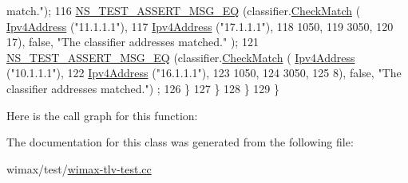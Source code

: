 \begin{DoxyCode}
{       match."});
116               \hyperlink{group__testing_ga2a9d78cffb3db8e867c35fff0b698cf5}{NS\_TEST\_ASSERT\_MSG\_EQ} (classifier.\hyperlink{classns3_1_1IpcsClassifierRecord_ad11e2dc1f66d5238281975bfd4da5180}{CheckMatch} (
      \hyperlink{classns3_1_1Ipv4Address}{Ipv4Address} (\textcolor{stringliteral}{"11.1.1.1"}),
117                                                             \hyperlink{classns3_1_1Ipv4Address}{Ipv4Address} (\textcolor{stringliteral}{"17.1.1.1"}),
118                                                             1050,
119                                                             3050,
120                                                             17), \textcolor{keyword}{false}, \textcolor{stringliteral}{"The classifier addresses matched."}
      );
121               \hyperlink{group__testing_ga2a9d78cffb3db8e867c35fff0b698cf5}{NS\_TEST\_ASSERT\_MSG\_EQ} (classifier.\hyperlink{classns3_1_1IpcsClassifierRecord_ad11e2dc1f66d5238281975bfd4da5180}{CheckMatch} (
      \hyperlink{classns3_1_1Ipv4Address}{Ipv4Address} (\textcolor{stringliteral}{"10.1.1.1"}),
122                                                             \hyperlink{classns3_1_1Ipv4Address}{Ipv4Address} (\textcolor{stringliteral}{"16.1.1.1"}),
123                                                             1050,
124                                                             3050,
125                                                             8), \textcolor{keyword}{false}, \textcolor{stringliteral}{"The classifier addresses matched."})
      ;
126             \}
127         \}
128     \}
129 \}
\end{DoxyCode}


Here is the call graph for this function\+:




The documentation for this class was generated from the following file\+:\begin{DoxyCompactItemize}
\item 
wimax/test/\hyperlink{wimax-tlv-test_8cc}{wimax-\/tlv-\/test.\+cc}\end{DoxyCompactItemize}
